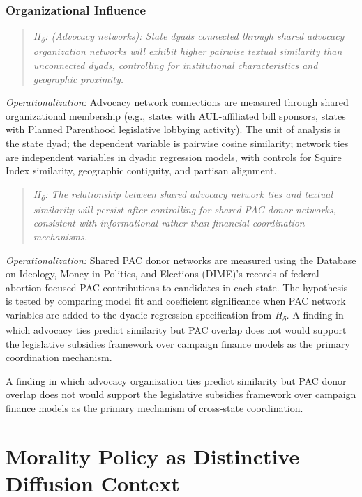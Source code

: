 \subsubsection{Organizational Influence}
\begin{quote}
\textit{H\textsubscript{5}: (Advocacy networks): State dyads connected through shared advocacy organization networks will exhibit higher pairwise textual similarity than unconnected dyads, controlling for institutional characteristics and geographic proximity.}
\end{quote}

\emph{Operationalization:} Advocacy network connections are measured through shared organizational membership (e.g., states with AUL-affiliated bill sponsors, states with Planned Parenthood legislative lobbying activity). The unit of analysis is the state dyad; the dependent variable is pairwise cosine similarity; network ties are independent variables in dyadic regression models, with controls for Squire Index similarity, geographic contiguity, and partisan alignment.

\begin{quote}
\textit{H\textsubscript{6}: The relationship between shared advocacy network ties and textual similarity will persist after controlling for shared PAC donor networks, consistent with informational rather than financial coordination mechanisms.}
\end{quote}
\emph{Operationalization:} Shared PAC donor networks are measured using the Database on Ideology, Money in Politics, and Elections (DIME)'s records of federal abortion-focused PAC contributions to candidates in each state. The hypothesis is tested by comparing model fit and coefficient significance when PAC network variables are added to the dyadic regression specification from \textit{H\textsubscript{5}.} A finding in which advocacy ties predict similarity but PAC overlap does not would support the legislative subsidies framework over campaign finance models as the primary coordination mechanism.

A finding in which advocacy organization ties predict similarity but PAC donor overlap does not would support the legislative subsidies framework \parencite{hallLobbyingLegislativeSubsidy2006a} over campaign finance models \parencite{hallBuyingTimeMoneyed} as the primary mechanism of cross-state coordination.

\section{Morality Policy as Distinctive Diffusion Context}
\label{sec:morality}

